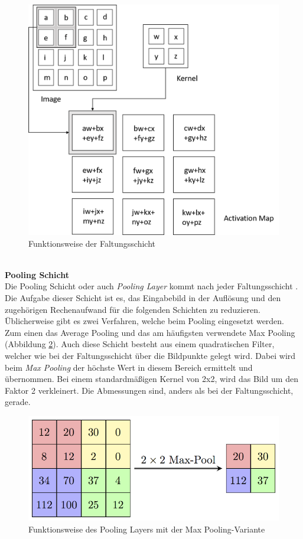 \begin{figure}
	[h]
	\centering
	\includegraphics[scale=0.4]{Sources/CNN.png}
	\caption{Funktionsweise der Faltungsschicht \cite{convolutional2019layer}}
	\label{img:faltungsschicht}
\end{figure}\\
\textbf{Pooling Schicht}\\
Die Pooling Schicht oder auch \textit{Pooling Layer} kommt nach jeder Faltungsschicht \cite[336f.]{goodfellow2016deep}. Die Aufgabe dieser Schicht ist es, das Eingabebild in der Auflösung und den zugehörigen Rechenaufwand für die folgenden Schichten zu reduzieren. Üblicherweise gibt es zwei Verfahren, welche beim Pooling eingesetzt werden. Zum einen das Average Pooling und das am häufigsten verwendete Max Pooling (Abbildung \ref{img:maxpooling}). Auch diese Schicht besteht aus einem quadratischen Filter, welcher wie bei der Faltungsschicht über die Bildpunkte gelegt wird. Dabei wird beim \textit{Max Pooling} der höchste Wert in diesem Bereich ermittelt und übernommen. Bei einem standardmäßigen Kernel von 2x2, wird das Bild um den Faktor 2 verkleinert. Die Abmessungen sind, anders als bei der Faltungsschicht, gerade.
\begin{figure}
	[h]
	\centering
	\includegraphics[scale=1.8]{Sources/MaxpoolSample2.png}
	\caption{Funktionsweise des Pooling Layers mit der Max Pooling-Variante \cite{pooling2018layer}}
	\label{img:maxpooling}
\end{figure}\\
